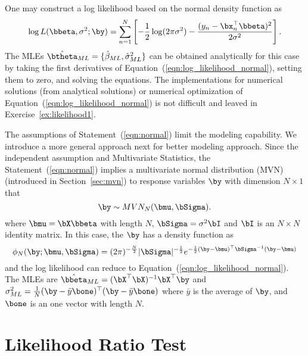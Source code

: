 One may construct a log likelihood based on the normal density function as
\begin{equation}
\log L(\bbeta, \sigma^2; \by) = \sum_{n = 1}^N
\left[
-\frac{1}{2} \log (2\pi \sigma^2) -
\frac{(y_n - \bx_n^\top\bbeta)^2}{2\sigma^2}
\right].
\label{eqn:log_likelihood_normal}
\end{equation}
The MLEs
$\hat{\btheta}_{ML} = \{\hat{\beta}_{ML}, \hat{\sigma}^2_{ML}\}$
can be obtained analytically for this case by
taking the first derivatives of Equation~(\ref{eqn:log_likelihood_normal}),
setting them to zero, and
solving the equations.
The implementations for numerical solutions (from analytical solutions)
or numerical optimization
of Equation~(\ref{eqn:log_likelihood_normal}) is not difficult
and leaved in Exercise~\ref{ex:likelihood1}.

The assumptions of Statement~(\ref{eqn:normal}) limit the modeling capability.
We introduce a more general approach next for better
modeling approach.
Since the independent assumption and Multivariate Statistics, the
Statement~(\ref{eqn:normal})
implies a multivariate normal distribution
(MVN)
(introduced in Section~\ref{sec:mvn})
to response variables $\by$ with dimension $N\times 1$ that
\begin{equation}
\by \sim MVN_N(\bmu, \bSigma).
\label{eqn:mvn_n}
\end{equation}
where $\bmu = \bX\bbeta$ with length $N$,
$\bSigma = \sigma^2 \bI$ and $\bI$ is an $N\times N$ identity matrix.
In this case, the $\by$ has a density function as
\begin{equation*}
\displaystyle
\phi_N(\by; \bmu, \bSigma) =
(2\pi)^{-\frac{N}{2}} |\bSigma|^{-\frac{1}{2}}
e^{-\frac{1}{2} (\by - \bmu)^\top \bSigma^{-1} (\by - \bmu)}
\end{equation*}
and the log likelihood can reduce to
Equation~(\ref{eqn:log_likelihood_normal}).
The MLEs are
$\hat{\bbeta}_{ML} = (\bX^\top \bX)^{-1} \bX^\top \by$ and
$\sigma^2_{ML} = \frac{1}{N} (\by - \bar{y}\bone)^\top(\by - \bar{y}\bone)$
where $\bar{y}$ is the average of $\by$,
and $\bone$ is an one vector with length $N$.




\section{Likelihood Ratio Test}
\label{sec:lrt}

